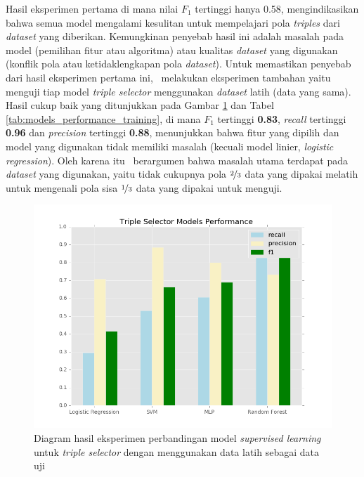 Hasil eksperimen pertama di mana nilai $F_1$ tertinggi hanya 0.58, mengindikasikan bahwa semua model mengalami kesulitan untuk mempelajari pola \textit{triples} dari \textit{dataset} yang diberikan. Kemungkinan penyebab hasil ini adalah masalah pada model (pemilihan fitur atau algoritma) atau kualitas \textit{dataset} yang digunakan (konflik pola atau ketidaklengkapan pola \textit{dataset}). Untuk memastikan penyebab dari hasil eksperimen pertama ini, \saya~melakukan eksperimen tambahan yaitu menguji tiap model \textit{triple selector} menggunakan \textit{dataset} latih (data yang sama). Hasil cukup baik yang ditunjukkan pada Gambar \ref{fig:models_performance_training} dan Tabel \ref{tab:models_performance_training}, di mana $F_1$ tertinggi \textbf{0.83}, \textit{recall} tertinggi \textbf{0.96} dan \textit{precision} tertinggi \textbf{0.88}, menunjukkan bahwa fitur yang dipilih dan model yang digunakan tidak memiliki masalah (kecuali model linier, \textit{logistic regression}). Oleh karena itu \saya~berargumen bahwa masalah utama terdapat pada \textit{dataset} yang digunakan, yaitu tidak cukupnya pola $\nicefrac{2}{3}$ data yang dipakai melatih untuk mengenali pola sisa $\nicefrac{1}{3}$ data yang dipakai untuk menguji.

\begin{figure}
	\includegraphics[width=\textwidth]{../images/models_performance_training.png}
	\caption{Diagram hasil eksperimen perbandingan model \textit{supervised learning} untuk \textit{triple selector} dengan menggunakan data latih sebagai data uji}
	\label{fig:models_performance_training}
\end{figure}

